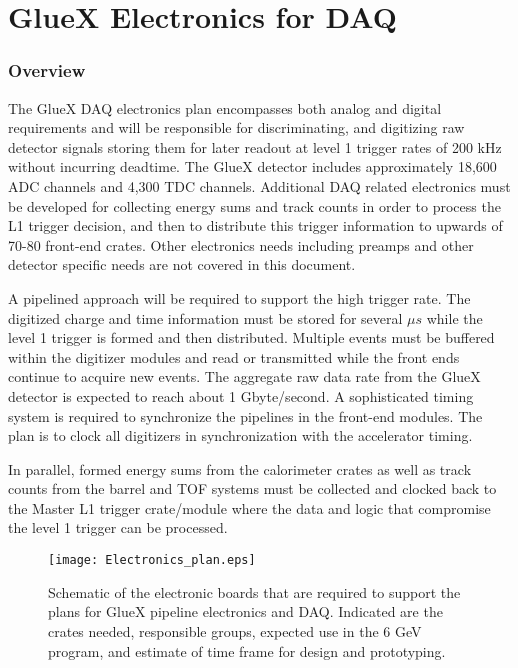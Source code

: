\documentclass[10pt]{article}
\begin{document}
\section*{GlueX Electronics for DAQ}


\subsubsection*{Overview}

The GlueX DAQ electronics plan encompasses both analog and digital requirements and will be 
responsible for discriminating, and digitizing raw detector signals
storing them for later readout at level 1 trigger rates of 200 kHz
without incurring deadtime.  The GlueX detector includes approximately 18,600 ADC 
channels and 4,300 TDC channels. Additional DAQ related electronics must be developed for
collecting energy sums and track counts in order to process the L1 trigger decision, and
then to distribute this trigger information to upwards of 70-80 front-end crates. Other
electronics needs including preamps and other detector specific needs are not covered
in this document.
 
A pipelined approach will be required to support the high trigger rate.  The
digitized charge and time information must be stored for several $ \mu s $ while the
level 1 trigger is formed and then distributed.  Multiple events must be buffered within
the digitizer modules and read or transmitted while the front ends continue to
acquire new events.  The aggregate raw data rate from the GlueX detector is expected to
reach  about 1 Gbyte/second. A sophisticated timing system is required to synchronize the
pipelines in the front-end modules.  The plan is to clock all digitizers in synchronization
with the accelerator timing.

In parallel, formed energy sums from the calorimeter crates as well as track counts from the 
barrel and TOF systems must be collected and clocked back to the Master L1 trigger crate/module 
where the data and logic that compromise the level 1 trigger can be processed.

\begin{figure}[p]
\begin{center}
\texttt{[image: Electronics\_plan.eps]}
\caption{Schematic of the electronic boards that are required to support
the plans for GlueX pipeline electronics and DAQ. 
Indicated are the crates needed, responsible groups,
expected use in the 6 GeV program, and estimate of time frame for design and
prototyping.
\label{fig:plan}}
\end{center}
\end{figure}
\end{document}
